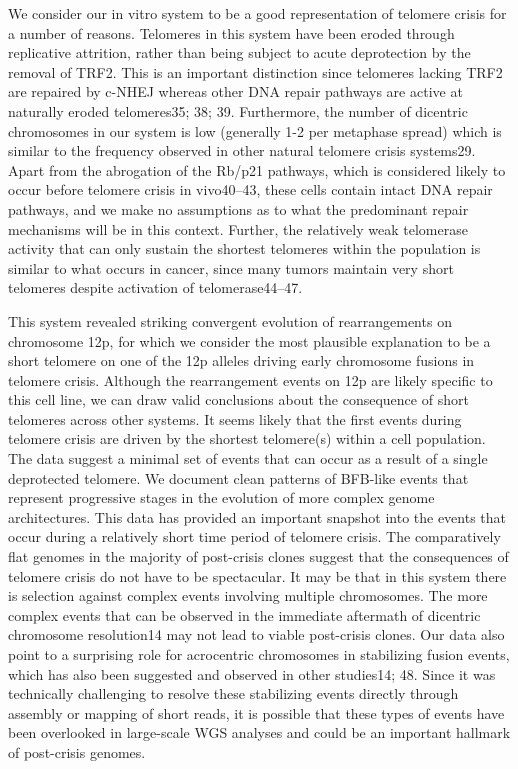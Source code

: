 \documentclass[phd,tocprelim]{cornell}
\begin{document}
We consider our in vitro system to be a good representation of telomere crisis for a number of reasons. Telomeres in this system have been eroded through replicative attrition, rather than being subject to acute deprotection by the removal of TRF2. This is an important distinction since telomeres lacking TRF2 are repaired by c-NHEJ whereas other DNA repair pathways are active at naturally eroded telomeres35; 38; 39. Furthermore, the number of dicentric chromosomes in our system is low (generally 1-2 per metaphase spread) which is similar to the frequency observed in other natural telomere crisis systems29. Apart from the abrogation of the Rb/p21 pathways, which is considered likely to occur before telomere crisis in vivo40–43, these cells contain intact DNA repair pathways, and we make no assumptions as to what the predominant repair mechanisms will be in this context. Further, the relatively weak telomerase activity that can only sustain the shortest telomeres within the population is similar to what occurs in cancer, since many tumors maintain very short telomeres despite activation of telomerase44–47. 

This system revealed striking convergent evolution of rearrangements on chromosome 12p, for which we consider the most plausible explanation to be a short telomere on one of the 12p alleles driving early chromosome fusions in telomere crisis. Although the rearrangement events on 12p are likely specific to this cell line, we can draw valid conclusions about the consequence of short telomeres across other systems. It seems likely that the first events during telomere crisis are driven by the shortest telomere(s) within a cell population. The data suggest a minimal set of events that can occur as a result of a single deprotected telomere. We document clean patterns of BFB-like events that represent progressive stages in the evolution of more complex genome architectures. This data has provided an important snapshot into the events that occur during a relatively short time period of telomere crisis. The comparatively flat genomes in the majority of post-crisis clones suggest that the consequences of telomere crisis do not have to be spectacular. It may be that in this system there is selection against complex events involving multiple chromosomes. The more complex events that can be observed in the immediate aftermath of dicentric chromosome resolution14 may not lead to viable post-crisis clones. Our data also point to a surprising role for acrocentric chromosomes in stabilizing fusion events, which has also been suggested and observed in other studies14; 48. Since it was technically challenging to resolve these stabilizing events directly through assembly or mapping of short reads, it is possible that these types of events have been overlooked in large-scale WGS analyses and could be an important hallmark of post-crisis genomes.
\end{document}
